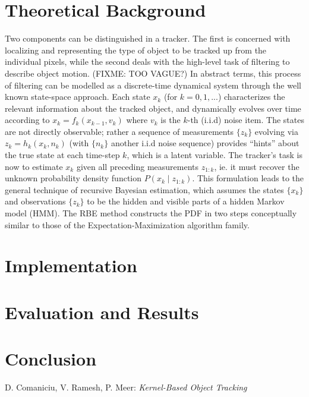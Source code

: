 \documentclass[a4paper,11pt]{article}
\begin{document}
	\section*{Theoretical Background}
		Two components can be distinguished in a tracker. The first is concerned
		with localizing and representing the type of object to be tracked up from
		the individual pixels, while the second deals with the high-level task of
		filtering to describe object motion. (FIXME: TOO VAGUE?) In abstract terms,
		this process of filtering can be modelled as a discrete-time dynamical system
		through the well known state-space approach. Each state $x_k$ (for $k=0, 1, ...$)
		characterizes the relevant information about the tracked object, and dynamically
		evolves over time according to $x_k = f_k(x_{k - 1}, v_k)$ where $v_k$ is the
		$k$-th (i.i.d) noise item. The states are not directly observable; rather a
		sequence of measurements $\{z_k\}$ evolving via $z_k = h_k(x_k, n_k)$ (with
		$\{n_k\}$ another i.i.d noise sequence) provides ``hints'' about the true
		state at each time-step $k$, which is a latent variable. The tracker's task
		is now to estimate $x_k$ given all preceding measurements $z_{1:k}$, ie. it
		must recover the unknown probability density function $P(x_k \mid z_{1:k})$.
		This formulation leads to the general technique of recursive Bayesian estimation,
		which assumes the states $\{x_k\}$ and observations $\{z_k\}$ to be the hidden
		and visible parts of a hidden Markov model (HMM). The RBE method constructs the
		PDF in two steps conceptually similar to those of the Expectation-Maximization
		algorithm family.

	\section*{Implementation}

	\section*{Evaluation and Results}

	\section*{Conclusion}

	\begin{thebibliography}{1}
			D. Comaniciu, V. Ramesh, P. Meer: \textit{Kernel-Based Object Tracking}
	\end{thebibliography}
\end{document}
